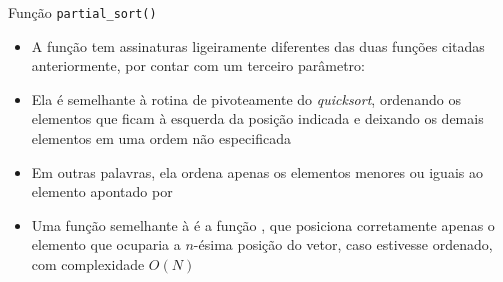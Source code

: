 \begin{frame}[fragile]{Função \texttt{partial\_sort()}}

    \begin{itemize}

        \item A função  tem assinaturas ligeiramente diferentes
            das duas funções citadas anteriormente, por contar com um terceiro parâmetro:


        \item Ela é semelhante à rotina de pivoteamente do
            \textit{quicksort}, ordenando os elementos que ficam à esquerda da posição 
            indicada e deixando os demais elementos em uma ordem não especificada

        \item Em outras palavras, ela ordena apenas os elementos menores ou iguais ao
            elemento apontado por 

        \item Uma função semelhante à  é a função 
            , que posiciona corretamente apenas o elemento que
            ocuparia a $n$-ésima posição do vetor, caso estivesse ordenado, com complexidade
            $O(N)$
    \end{itemize}

\end{frame}

